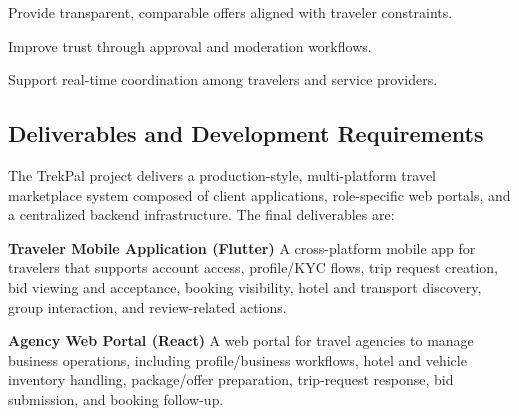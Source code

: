 \documentclass[12pt,a4paper]{article}
\newlength{\ThesisParagraphIndent}
\newcommand{\ThesisParagraph}[1]{%
  \par\begingroup
  \setlength{\leftskip}{\ThesisParagraphIndent}%
  \setlength{\parindent}{0pt}%
  \noindent#1\par
  \endgroup}
\begin{document}
\begin{list}{}{\setlength{\leftmargin}{\dimexpr\ThesisParagraphIndent+1.5em\relax}\setlength{\labelsep}{0.5em}\setlength{\topsep}{2pt}\setlength{\parsep}{0pt}}
\item[\textbullet] Provide transparent, comparable offers aligned with traveler constraints.
\end{list}


\begin{list}{}{\setlength{\leftmargin}{\dimexpr\ThesisParagraphIndent+1.5em\relax}\setlength{\labelsep}{0.5em}\setlength{\topsep}{2pt}\setlength{\parsep}{0pt}}
\item[\textbullet] Improve trust through approval and moderation workflows.
\end{list}


\begin{list}{}{\setlength{\leftmargin}{\dimexpr\ThesisParagraphIndent+1.5em\relax}\setlength{\labelsep}{0.5em}\setlength{\topsep}{2pt}\setlength{\parsep}{0pt}}
\item[\textbullet] Support real-time coordination among travelers and service providers.
\end{list}


\subsection{Deliverables and Development Requirements}

\ThesisParagraph{The TrekPal project delivers a production-style, multi-platform travel marketplace system composed of client applications, role-specific web portals, and a centralized backend infrastructure. The final deliverables are:}


\begin{list}{}{\setlength{\leftmargin}{\dimexpr\ThesisParagraphIndent+1.5em\relax}\setlength{\labelsep}{0.5em}\setlength{\topsep}{2pt}\setlength{\parsep}{0pt}}
\item[1.] \textbf{Traveler Mobile Application (Flutter)}\newline{} A cross-platform mobile app for travelers that supports account access, profile/KYC flows, trip request creation, bid viewing and acceptance, booking visibility, hotel and transport discovery, group interaction, and review-related actions.
\end{list}


\begin{list}{}{\setlength{\leftmargin}{\dimexpr\ThesisParagraphIndent+1.5em\relax}\setlength{\labelsep}{0.5em}\setlength{\topsep}{2pt}\setlength{\parsep}{0pt}}
\item[2.] \textbf{Agency Web Portal (React)}\newline{} A web portal for travel agencies to manage business operations, including profile/business workflows, hotel and vehicle inventory handling, package/offer preparation, trip-request response, bid submission, and booking follow-up.
\end{list}
\end{document}
